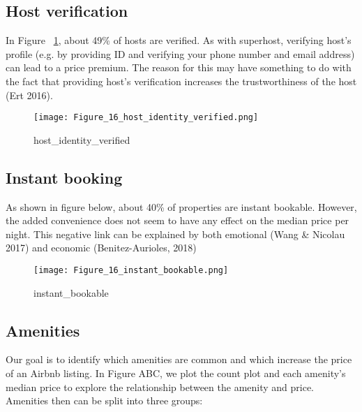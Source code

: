 \subsection{Host verification}

In Figure ~\ref{fig:host_identity_verified}, about 49\% of hosts are verified.
As with superhost, verifying host's profile (e.g. by providing ID and verifying
your phone number and email address) can lead to a price premium. The reason for
this may have something to do with the fact that providing host's verification
increases the trustworthiness of the host (Ert 2016).

\begin{figure}[H]
    \centering
    \caption{host\_identity\_verified}
    \texttt{[image: Figure\_16\_host\_identity\_verified.png]}
    \label{fig:host_identity_verified}
\end{figure}

\subsection{Instant booking}

As shown in figure below, about 40\% of properties are instant bookable. However, the added
convenience does not seem to have any effect on the median price per night. This
negative link can be explained by both emotional (Wang \& Nicolau 2017) and
economic (Benitez-Aurioles, 2018)

\begin{figure}[H]
    \centering
    \caption{instant\_bookable}
    \texttt{[image: Figure\_16\_instant\_bookable.png]}
    \label{fig:instant_bookable}
\end{figure}

\subsection{Amenities}

Our goal is to identify which amenities are common and which increase the price
of an Airbnb listing.  In Figure ABC, we plot the count plot and each amenity's
median price to explore the relationship between the amenity and price.
Amenities then can be split into three groups:

